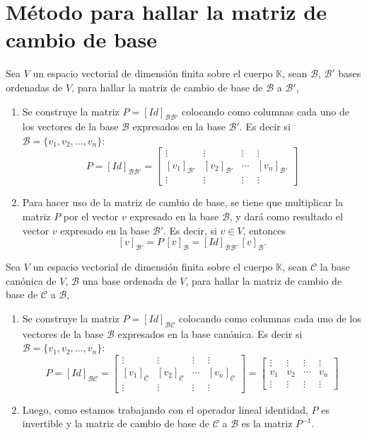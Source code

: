 \documentclass{article}
\begin{document}
\section*{Método para hallar la matriz de cambio de base}
Sea $V$ un espacio vectorial de dimensión finita sobre el cuerpo $\mathbb{K}$, sean $\mathcal{B}$, $\mathcal{B}'$  bases ordenadas de $V$, para hallar la matriz de cambio de base de $\mathcal{B}$ a $\mathcal{B}'$,
\begin{enumerate}
    \item Se construye la matriz $P = [Id]_{\mathcal{B} \mathcal{B}'}$ colocando como columnas cada uno de los vectores de la base $\mathcal{B}$ expresados en la base $\mathcal{B}'$. Es decir si $\mathcal{B} = \{ v_1,v_2,\dots, v_n \}$:
    $$
    P = [Id]_{\mathcal{B} \mathcal{B}'} = \begin{bmatrix}
        \vdots & \vdots & \vdots & \vdots \\ 
    [v_1]_{\mathcal{B}'} & [v_2]_{\mathcal{B}'} & \cdots & [v_n]_{\mathcal{B}'} \\
    \vdots & \vdots & \vdots & \vdots 
    \end{bmatrix}
    $$
    \item Para hacer uso de la matriz de cambio de base, se tiene que multiplicar la matriz $P$ por el vector $v$ expresado en la base $\mathcal{B}$, y dará como resultado el vector $v$ expresado en la base $\mathcal{B}'$. Es decir, si $v \in V$, entonces
    \[
    [v]_{\mathcal{B}'} = P\, [v]_{\mathcal{B}} = [Id]_{\mathcal{B} \mathcal{B}'}\, [v]_{\mathcal{B}}.
    \]
\end{enumerate}
Sea $V$ un espacio vectorial de dimensión finita sobre el cuerpo $\mathbb{K}$, sean $\mathcal{C}$ la base canónica de $V$, $\mathcal{B}$ una base ordenada de $V$, para hallar la matriz de cambio de base de $\mathcal{C}$ a $\mathcal{B}$,
\begin{enumerate}
    \item Se construye la matriz $P = [Id]_{\mathcal{B} \mathcal{C}}$ colocando como columnas cada uno de los vectores de la base $\mathcal{B}$ expresados en la base canónica. Es decir si $\mathcal{B} = \{ v_1,v_2,\dots, v_n \}$:
    $$
    P = [Id]_{\mathcal{B} \mathcal{C}} = \begin{bmatrix}
        \vdots & \vdots & \vdots & \vdots \\ 
    [v_1]_{\mathcal{C}} & [v_2]_{\mathcal{C}} & \cdots & [v_n]_{\mathcal{C}} \\
    \vdots & \vdots & \vdots & \vdots \end{bmatrix} =
    \begin{bmatrix}
        \vdots & \vdots & \vdots & \vdots \\ 
    v_1 & v_2 & \cdots & v_n \\
    \vdots & \vdots & \vdots & \vdots
    \end{bmatrix}
    $$
    \item Luego, como estamos trabajando con el operador lineal identidad, $P$ es invertible y la matriz de cambio de base de $\mathcal{C}$ a $\mathcal{B}$ es la matriz $P^{-1}$.
\end{enumerate}
\end{document}

